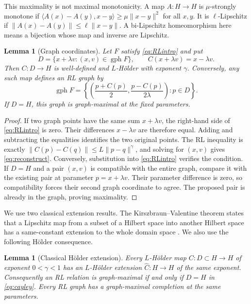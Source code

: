 \documentclass[11pt]{article}
\numberwithin{equation}{section}
\newtheorem{lemma}[theorem]{Lemma}
\theoremstyle{definition}
\theoremstyle{remark}
\newcommand{\gph}{\operatorname{gph}}
\newcommand{\ip}[2]{\langle #1,#2\rangle}
\newcommand{\norm}[1]{\lVert #1\rVert}
\begin{document}
This maximality is not maximal monotonicity. A map $A:H\to H$ is
$\mu$-strongly monotone if
$\ip{A(x)-A(y)}{x-y}\ge\mu\norm{x-y}^2$ for all $x,y$. It is
$\ell$-Lipschitz if $\norm{A(x)-A(y)}\le\ell\norm{x-y}$. A bi-Lipschitz
homeomorphism here means a bijection whose map and inverse are Lipschitz.

\begin{lemma}[Graph coordinates]\label{lem:cayley}
Let $F$ satisfy \eqref{eq:RLintro} and put
\begin{equation}\label{eq:cayley}
 D=\{x+\lambda v:(x,v)\in\gph F\},\qquad
 C(x+\lambda v)=x-\lambda v.
\end{equation}
Then $C:D\to H$ is well-defined and $L$-H\"older with exponent $\gamma$.
Conversely, any such map defines an RL graph by
\begin{equation}\label{eq:reconstruct}
 \gph F=\left\{\left(\frac{p+C(p)}2,
                    \frac{p-C(p)}{2\lambda}\right):p\in D\right\}.
\end{equation}
If $D=H$, this graph is graph-maximal at the fixed parameters.
\end{lemma}

\begin{proof}
If two graph points have the same sum $x+\lambda v$, the right-hand side
of \eqref{eq:RLintro} is zero. Their differences $x-\lambda v$ are therefore
equal. Adding and subtracting the equalities identifies the two original
points. The RL inequality is exactly
$\norm{C(p)-C(q)}\le L\norm{p-q}^\gamma$, and solving for $(x,v)$ gives
\eqref{eq:reconstruct}. Conversely, substitution into \eqref{eq:RLintro}
verifies the condition. If $D=H$ and a pair $(x,v)$ is compatible with the
entire graph, compare it with the existing pair at parameter
$p=x+\lambda v$. Their parameter difference is zero, so compatibility
forces their second graph coordinate to agree. The proposed pair is
already in the graph, proving maximality.
\end{proof}

We use two classical extension results. The Kirszbraun--Valentine theorem states that
a Lipschitz map from a subset of a Hilbert space into another Hilbert
space has a same-constant extension to the whole domain space
\cite{Kirszbraun,Valentine}. We also use the following H\"older consequence.

\begin{lemma}[Classical H\"older extension]\label{lem:holderextension}
Every $L$-H\"older map $C:D\subset H\to H$ of exponent $0<\gamma<1$
has an $L$-H\"older extension $\widehat C:H\to H$ of the same exponent.
Consequently an RL relation is graph-maximal if and only if $D=H$ in
\eqref{eq:cayley}. Every RL graph has a graph-maximal completion at the
same parameters.
\end{lemma}
\end{document}
